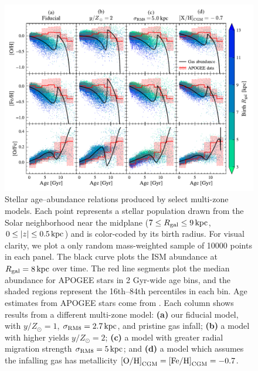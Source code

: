\documentclass[twocolumn,twocolappendix,linenumbers]{aastex631}
\begin{document}
\begin{figure}
    \centering
    \includegraphics{figures/abundance_evolution.pdf}
    \caption{Stellar age--abundance relations produced by select multi-zone models. Each point represents a stellar population drawn from the Solar neighborhood near the midplane ($7\leq R_{\rm gal}\leq 9\,{\rm kpc}$, $0\leq |z| \leq 0.5\,{\rm kpc}$) and is color-coded by its birth radius. For visual clarity, we plot a only random mass-weighted sample of \num{10000} points in each panel. The black curve plots the ISM abundance at $R_{\rm gal}=8\,{\rm kpc}$ over time. The red line segments plot the median abundance for APOGEE stars in {2 Gyr}-wide age bins, and the shaded regions represent the 16th--84th percentiles in each bin. Age estimates from APOGEE stars come from \citet{leung_variational_2023}. Each column shows results from a different multi-zone model: {\bf (a)} our fiducial model, with $y/Z_\odot=1$, $\sigma_{\rm RM8}=2.7\,{\rm kpc}$, and pristine gas infall; {\bf (b)} a model with higher yields $y/Z_\odot=2$; {\bf (c)} a model with greater radial migration strength $\sigma_{\rm RM8}=5\,{\rm kpc}$; and {\bf (d)} a model which assumes the infalling gas has metallicity ${\rm [O/H]}_{\rm CGM}={\rm [Fe/H]}_{\rm CGM}=-0.7$.}
    \label{fig:abundance-evolution}
\end{figure}
\end{document}
